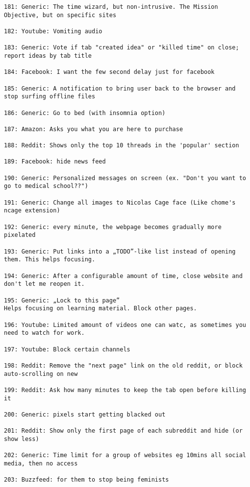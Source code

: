 \begin{lstlisting}[breaklines]
181: Generic: The time wizard, but non-intrusive. The Mission Objective, but on specific sites

182: Youtube: Vomiting audio

183: Generic: Vote if tab "created idea" or "killed time" on close; report ideas by tab title

184: Facebook: I want the few second delay just for facebook

185: Generic: A notification to bring user back to the browser and stop surfing offline files

186: Generic: Go to bed (with insomnia option)

187: Amazon: Asks you what you are here to purchase

188: Reddit: Shows only the top 10 threads in the 'popular' section

189: Facebook: hide news feed

190: Generic: Personalized messages on screen (ex. "Don't you want to go to medical school??")

191: Generic: Change all images to Nicolas Cage face (Like chome's ncage extension)

192: Generic: every minute, the webpage becomes gradually more pixelated

193: Generic: Put links into a „TODO”-like list instead of opening them. This helps focusing.

194: Generic: After a configurable amount of time, close website and don't let me reopen it.

195: Generic: „Lock to this page”
Helps focusing on learning material. Block other pages.

196: Youtube: Limited amount of videos one can watc, as sometimes you need to watch for work.

197: Youtube: Block certain channels

198: Reddit: Remove the "next page" link on the old reddit, or block auto-scrolling on new

199: Reddit: Ask how many minutes to keep the tab open before killing it

200: Generic: pixels start getting blacked out

201: Reddit: Show only the first page of each subreddit and hide (or show less)

202: Generic: Time limit for a group of websites eg 10mins all social media, then no access

203: Buzzfeed: for them to stop being feminists


\end{lstlisting}
